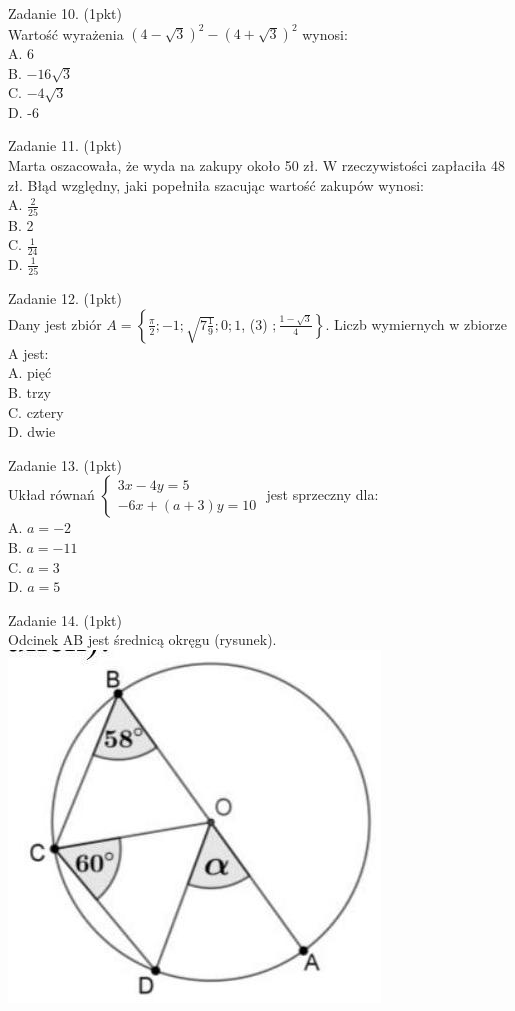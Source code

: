 \documentclass[10pt]{article}
\begin{document}
Zadanie 10. (1pkt)\\
Wartość wyrażenia \((4-\sqrt{3})^{2}-(4+\sqrt{3})^{2}\) wynosi:\\
A. 6\\
B. \(-16 \sqrt{3}\)\\
C. \(-4 \sqrt{3}\)\\
D. -6

Zadanie 11. (1pkt)\\
Marta oszacowała, że wyda na zakupy około 50 zł. W rzeczywistości zapłaciła 48 zł. Błąd względny, jaki popełniła szacując wartość zakupów wynosi:\\
A. \(\frac{2}{25}\)\\
B. 2\\
C. \(\frac{1}{24}\)\\
D. \(\frac{1}{25}\)

Zadanie 12. (1pkt)\\
Dany jest zbiór \(A=\left\{\frac{\pi}{2} ;-1 ; \sqrt{7 \frac{1}{9}} ; 0 ; 1\right.\), (3) \(\left.; \frac{1-\sqrt{3}}{4}\right\}\). Liczb wymiernych w zbiorze A jest:\\
A. pięć\\
B. trzy\\
C. cztery\\
D. dwie

Zadanie 13. (1pkt)\\
Układ równań \(\left\{\begin{array}{c}3 x-4 y=5 \\ -6 x+(a+3) y=10\end{array}\right.\) jest sprzeczny dla:\\
A. \(a=-2\)\\
B. \(a=-11\)\\
C. \(a=3\)\\
D. \(a=5\)

Zadanie 14. (1pkt)\\
Odcinek AB jest średnicą okręgu (rysunek).\\
\includegraphics[max width=\textwidth, center]{2024_11_21_55bf50695fa934dbe20eg-04}
\end{document}
